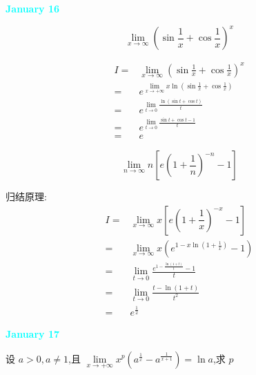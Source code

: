 \textcolor{cyan}{\textbf{January 16}}

\begin{example}[][Exam: 27.3.3]
	$$\lim\limits_{x\to \infty}\left(\sin\frac{1}{x}+\cos\frac{1}{x} \right)^{x}$$
\end{example}

\begin{solution}

	\begin{align*}
		I = & \lim\limits_{x\to \infty}\left(\sin\frac{1}{x}+\cos\frac{1}{x} \right)^{x}\\
		  = & e^{\lim\limits_{x\to +\infty}x\ln(\sin\frac{1}{x}+\cos\frac{1}{x})}\\
		  = & e^{\lim\limits_{t\to 0}\frac{\ln(\sin t+\cos t)}{t}}\\
		  = & e^{\lim\limits_{t\to 0}\frac{\sin t+\cos t-1}{t}}\\
		  = & e
	\end{align*}
\end{solution}

\begin{example}[][Exam:27.3.4]
	$$\lim\limits_{n\to \infty}n\left[e\left(1+\dfrac{1}{n} \right)^{-n}-1 \right]$$
\end{example}

\begin{solution}
	
	归结原理:
	\begin{align*}
		I = & \lim\limits_{x\to \infty}x\left[e\left(1+\dfrac{1}{x} \right)^{-x}-1 \right]\\
		  = & \lim\limits_{x\to \infty}x(e^{1-x\ln(1+\frac{1}{x})}-1)\\
		  = & \lim\limits_{t\to 0}\frac{e^{1-\frac{\ln(1+t)}{t}}-1}{t}\\
		  = & \lim\limits_{t\to 0}\frac{t-\ln(1+t)}{t^{2}}\\
		  = & e^{\frac{1}{2}}
	\end{align*}
\end{solution}

\textcolor{cyan}{\textbf{January 17}}

\begin{example}[][Exam: 27.3.5]
	设 $a>0,a\neq 1$,且 $\lim\limits_{x\to +\infty}x^{p}(a^{\frac{1}{x}}-a^{\frac{1}{x+1}})=\ln a$,求 $p$
\end{example}

